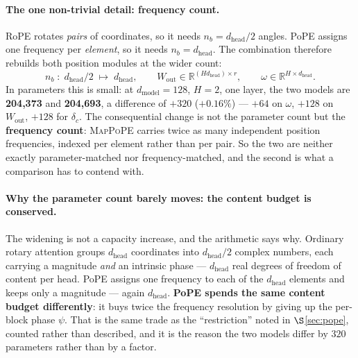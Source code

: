 \documentclass[11pt]{article}
\newcommand{\R}{\mathbb{R}}
\newcommand{\hd}{d_{\mathrm{head}}}
\newcommand{\nb}{n_b}
\begin{document}
\paragraph{The one non-trivial detail: frequency count.}
RoPE rotates \emph{pairs} of coordinates, so it needs $\nb = \hd/2$ angles. PoPE
assigns one frequency per \emph{element}, so it needs $\nb = \hd$. The combination
therefore rebuilds both position modules at the wider count:
\begin{equation}
  \nb \;:\; \hd/2 \;\longmapsto\; \hd,
  \qquad
  W_{\mathrm{out}} \in \R^{(H\hd)\times r},
  \qquad
  \omega \in \R^{H\times \hd}.
\end{equation}
In parameters this is small: at $d_{\text{model}}=128$, $H=2$, one layer, the two
models are \textbf{204,373} and \textbf{204,693}, a difference of $+320$
($+0.16\%$) --- $+64$ on $\omega$, $+128$ on $W_{\mathrm{out}}$, $+128$ for
$\delta_c$. The consequential change is not the parameter count but the
\textbf{frequency count}: \textsc{MapPoPE} carries twice as many independent
position frequencies, indexed per element rather than per pair. So the two are
neither exactly parameter-matched nor frequency-matched, and the second is what a
comparison has to contend with.

\paragraph{Why the parameter count barely moves: the content budget is conserved.}
The widening is not a capacity increase, and the arithmetic says why. Ordinary
rotary attention groups $\hd$ coordinates into $\hd/2$ complex numbers, each
carrying a magnitude \emph{and} an intrinsic phase --- $\hd$ real degrees of
freedom of content per head. PoPE assigns one frequency to each of the $\hd$
elements and keeps only a magnitude --- again $\hd$. \textbf{PoPE spends the same
content budget differently}: it buys twice the frequency resolution by giving up
the per-block phase $\psi$. That is the same trade as the ``restriction'' noted in
$\S$\ref{sec:pope}, counted rather than described, and it is the reason the two
models differ by $320$ parameters rather than by a factor.
\end{document}
